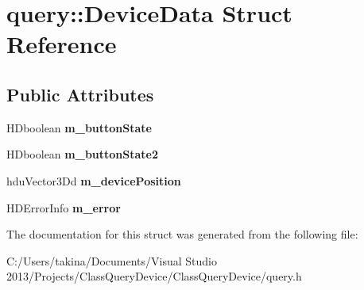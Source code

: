 \hypertarget{structquery_1_1_device_data}{}\section{query\+:\+:Device\+Data Struct Reference}
\label{structquery_1_1_device_data}
\subsection*{Public Attributes}
\begin{DoxyCompactItemize}
\item 
\hypertarget{structquery_1_1_device_data_a83acf1fe206a0106b31e5d9d67bea2a3}{}\label{structquery_1_1_device_data_a83acf1fe206a0106b31e5d9d67bea2a3} 
H\+Dboolean {\bfseries m\+\_\+button\+State}
\item 
\hypertarget{structquery_1_1_device_data_a29564a8bc692909b85500f125a5b6510}{}\label{structquery_1_1_device_data_a29564a8bc692909b85500f125a5b6510} 
H\+Dboolean {\bfseries m\+\_\+button\+State2}
\item 
\hypertarget{structquery_1_1_device_data_a13118d6d45fa6acc1648a9534c5de10f}{}\label{structquery_1_1_device_data_a13118d6d45fa6acc1648a9534c5de10f} 
hdu\+Vector3\+Dd {\bfseries m\+\_\+device\+Position}
\item 
\hypertarget{structquery_1_1_device_data_afcfd2e1ade2602dfd00a6167e12a8ee2}{}\label{structquery_1_1_device_data_afcfd2e1ade2602dfd00a6167e12a8ee2} 
H\+D\+Error\+Info {\bfseries m\+\_\+error}
\end{DoxyCompactItemize}


The documentation for this struct was generated from the following file\+:\begin{DoxyCompactItemize}
\item 
C\+:/\+Users/takina/\+Documents/\+Visual Studio 2013/\+Projects/\+Class\+Query\+Device/\+Class\+Query\+Device/query.\+h\end{DoxyCompactItemize}

